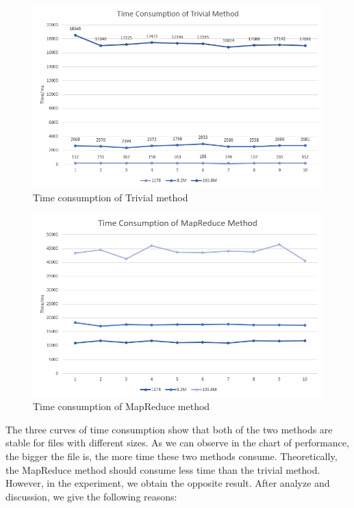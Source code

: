\documentclass[a4paper,14pt,UTF8]{article}
\begin{document}
		\begin{figure}[h]
			\setlength{\abovecaptionskip}{-0.cm}
			
			\begin{center}
				\includegraphics[width=12cm]{trivial_method}
			\end{center}
			\caption{Time consumption of Trivial method}
		\end{figure}
	
		\begin{figure}[H]
			\setlength{\abovecaptionskip}{-0.cm}
			
			\begin{center}
				\includegraphics[width=12cm]{mapreduce_method}
			\end{center}
			\caption{Time consumption of MapReduce method}
		\end{figure}

	
		\quad The three curves of time consumption show that both of the two methods are stable for files with different sizes. As we can observe in the chart of performance, the bigger the file is, the more time these two methods consume. Theoretically, the MapReduce method should consume less time than the trivial method. However, in the experiment, we obtain the opposite result. After analyze and discussion, we give the following reasons: 
\end{document}

